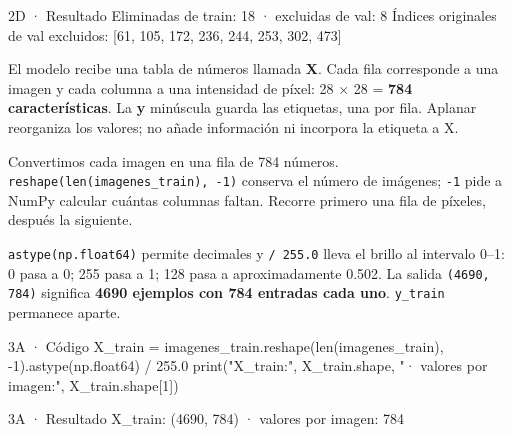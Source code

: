 
\begin{Salida}{2D · Resultado}
Eliminadas de train: 18 · excluidas de val: 8
Índices originales de val excluidos: [61, 105, 172, 236, 244, 253, 302, 473]
\end{Salida}

\label{bloque-3}

El modelo recibe una tabla de números llamada \textbf{X}. Cada fila corresponde a una imagen y cada columna a una intensidad de píxel: 28 $\times$ 28 = \textbf{784 características}. La \textbf{y} minúscula guarda las etiquetas, una por fila. Aplanar reorganiza los valores; no añade información ni incorpora la etiqueta a X.


\label{paso-3a}

Convertimos cada imagen en una fila de 784 números. \texttt{\small reshape(\allowbreak{}len(\allowbreak{}imagenes\_\allowbreak{}train)\allowbreak{},\allowbreak{} -1)\allowbreak{}} conserva el número de imágenes; \texttt{\small -1} pide a NumPy calcular cuántas columnas faltan. Recorre primero una fila de píxeles, después la siguiente.

\texttt{\small astype(\allowbreak{}np.\allowbreak{}float64)\allowbreak{}} permite decimales y \texttt{\small /\allowbreak{} 255.\allowbreak{}0} lleva el brillo al intervalo 0–1: 0 pasa a 0; 255 pasa a 1; 128 pasa a aproximadamente 0.502. La salida \texttt{\small (\allowbreak{}4690,\allowbreak{} 784)\allowbreak{}} significa \textbf{4690 ejemplos con 784 entradas cada uno}. \texttt{\small y\_\allowbreak{}train} permanece aparte.


\begin{Codigo}{3A · Código}
X_train = imagenes_train.reshape(len(imagenes_train), -1).astype(np.float64) / 255.0
print("X_train:", X_train.shape, "· valores por imagen:", X_train.shape[1])
\end{Codigo}

\begin{Salida}{3A · Resultado}
X_train: (4690, 784) · valores por imagen: 784
\end{Salida}

